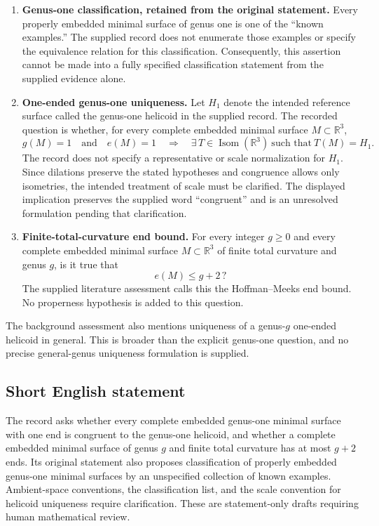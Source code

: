 \documentclass[11pt]{article}
\newcommand{\R}{\mathbb{R}}
\begin{document}
\begin{enumerate}
\item \textbf{Genus-one classification, retained from the original statement.} Every properly embedded minimal surface of genus one is one of the ``known examples.'' The supplied record does not enumerate those examples or specify the equivalence relation for this classification. Consequently, this assertion cannot be made into a fully specified classification statement from the supplied evidence alone.

\item \textbf{One-ended genus-one uniqueness.} Let \(H_1\) denote the intended reference surface called the genus-one helicoid in the supplied record. The recorded question is whether, for every complete embedded minimal surface \(M\subset\R^3\),
\[
 g(M)=1\quad\text{and}\quad e(M)=1
 \quad\Longrightarrow\quad
 \exists\, T\in\operatorname{Isom}(\R^3)\ \text{such that}\ T(M)=H_1.
\]
The record does not specify a representative or scale normalization for \(H_1\). Since dilations preserve the stated hypotheses and congruence allows only isometries, the intended treatment of scale must be clarified. The displayed implication preserves the supplied word ``congruent'' and is an unresolved formulation pending that clarification.

\item \textbf{Finite-total-curvature end bound.} For every integer \(g\geq 0\) and every complete embedded minimal surface \(M\subset\R^3\) of finite total curvature and genus \(g\), is it true that
\[
 e(M)\leq g+2\,?
\]
The supplied literature assessment calls this the Hoffman--Meeks end bound. No properness hypothesis is added to this question.
\end{enumerate}

The background assessment also mentions uniqueness of a genus-\(g\) one-ended helicoid in general. This is broader than the explicit genus-one question, and no precise general-genus uniqueness formulation is supplied.
\subsection{Short English statement}
The record asks whether every complete embedded genus-one minimal surface with one end is congruent to the genus-one helicoid, and whether a complete embedded minimal surface of genus \(g\) and finite total curvature has at most \(g+2\) ends. Its original statement also proposes classification of properly embedded genus-one minimal surfaces by an unspecified collection of known examples. Ambient-space conventions, the classification list, and the scale convention for helicoid uniqueness require clarification. These are statement-only drafts requiring human mathematical review.
\end{document}
